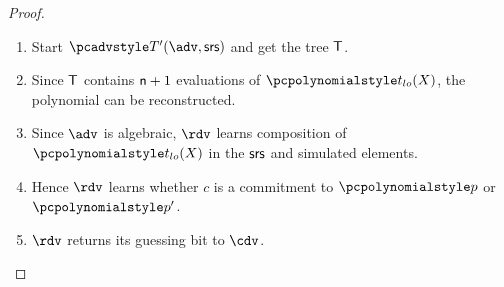 \documentclass[runningheads,11pt]{llncs}
\begin{document}
\begin{proof}
\begin{enumerate}
    $\adv$ asks for $s$-th simulated proof, $\tdv'$'s internal procedure $\bdv'$
    provides $\adv$ with a simulated proof such that instead of a simulated
    $\p{t_{lo}} (\chi)$  it gives $c'$.
  \item Start $\tdv'(\adv, \srs)$ and get the tree $\mathsf{T}$.
  \item Since $\mathsf{T}$ contains $\mathsf{n} + 1$ evaluations of $\p{t_{lo}} (X)$, the
    polynomial can be reconstructed. 
  \item Since $\adv$ is algebraic, $\rdv$ learns composition of $\p{t_{lo}} (X)$ in
    the $\mathsf{srs}$ and simulated elements. 
  \item Hence $\rdv$ learns whether $c$ is a commitment to $\p{p}$ or $\p{p'}$.
  \item $\rdv$ returns its guessing bit to $\cdv$.
  \end{enumerate}
\end{proof}
\end{document}
